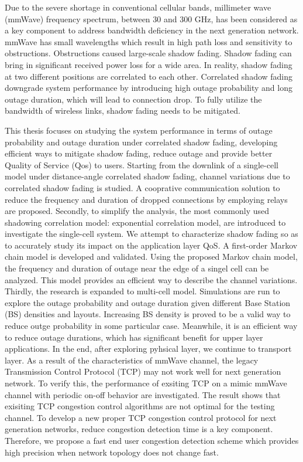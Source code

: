 \par Due to the severe shortage in conventional cellular bands, millimeter wave (mmWave) frequency spectrum, between 30 and 300 GHz, has been considered as a key component to address bandwidth deficiency in the next generation network. mmWave has small wavelengths which result in high path loss and sensitivity to obstructions. Obstructions caused large-scale shadow fading. Shadow fading can bring in significant received power loss for a wide area. In reality, shadow fading at two different positions are correlated to each other. Correlated shadow fading downgrade system performance by introducing high outage probability and long outage duration, which will lead to connection drop. To fully utilize the bandwidth of wireless links, shadow fading needs to be mitigated.
\par This thesis focuses on studying the system performance in terms of outage probability and outage duration under correlated shadow fading, developing efficient ways to mitigate shadow fading, reduce outage and provide better Quality of Service (Qos) to users. Starting from the downlink of a single-cell model under distance-angle correlated shadow fading, channel variations due to correlated shadow fading is studied. A cooprative communication solution to reduce the frequency and duration of dropped connections by employing relays are proposed. Secondly, to simplify the analysis, the most commonly used shadowing correlation model: exponential correlation model, are introduced to investigate the single-cell system. We attempt to characterize shadow fading so as to accurately study its impact on the application layer QoS. A first-order Markov chain model is developed and validated. Using the proposed Markov chain model, the frequency and duration of outage near the edge of a singel cell can be analyzed. This model provides an efficient way to describe the channel variations. Thirdly, the research is expanded to multi-cell model. Simulations are run to explore the outage probability and outage duration given different Base Station (BS) densities and layouts. Increasing BS density is proved to be a valid way to reduce outge probability in some particular case. Meanwhile, it is an efficient way to reduce outage durations, which has significant benefit for upper layer applications. In the end, after exploring pyhsical layer, we continue to transport layer. As a result of the characteristics of mmWave channel, the legacy Transmission Control Protocol (TCP) may not work well for next generation network. To verify this, the performance of exsiting TCP on a mimic mmWave channel with periodic on-off behavior are investigated. The result shows that exisiting TCP congestion control algorithms are not optimal for the testing channel. To develop a new proper TCP congestion control protocol for next generation networks, reduce congestion detection time is a key component. Therefore, we propose a fast end user congestion detection scheme which provides high precision when network topology does not change fast.

